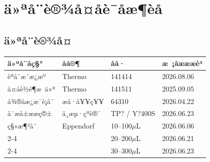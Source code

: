 \documentclass[UTF8,10pt,a4paper,fontset=fandol]{ctexart}
\newcommand{\fieldvalue}[1]{#1}
\newcommand{\handwritten}[1]{#1}
\begin{document}
\section{ä»ªå¨è®¾å¤åè¯åæ¶èå}

\subsection{ä»ªå¨è®¾å¤}

\begin{tabularx}{\textwidth}{|l|l|l|X|}
\hline
ä»ªå¨åç§° & åå®¶ & åå· & æ ¡åæææè³ \\
\hline
èªå¨æ´æ¿æº & Thermo &
\fieldvalue{\handwritten{141414}} &
\fieldvalue{\handwritten{2026.08.06}}
\\ \hline
å¤åè½é¶æ ä»ª & Thermo &
\fieldvalue{\handwritten{141511}} &
\fieldvalue{\handwritten{2025.09.05}}
\\ \hline
å¾®å­æ¿æ¯è¡å¨ & æ­å·å¥¥ç¥¥ &
\fieldvalue{\handwritten{64310}} &
\fieldvalue{\handwritten{2026.04.22}}
\\ \hline
å¯æå±ææç®± & ä¸æµ·çªè®¯ &
\fieldvalue{\handwritten{TP? / Y?400S}} &
\fieldvalue{\handwritten{2026.06.23}}
\\ \hline
ç§»æ¶²å¨ & Eppendorf &
\fieldvalue{\handwritten{10--100$\mu$L}} &
\fieldvalue{\handwritten{2026.06.06}}
\\ \cline{2-4}
 & &
\fieldvalue{\handwritten{20--200$\mu$L}} &
\fieldvalue{\handwritten{2026.06.21}}
\\ \cline{2-4}
 & &
\fieldvalue{\handwritten{30--300$\mu$L}} &
\fieldvalue{\handwritten{2026.06.23}}
\\ \hline
\end{tabularx}
\end{document}
